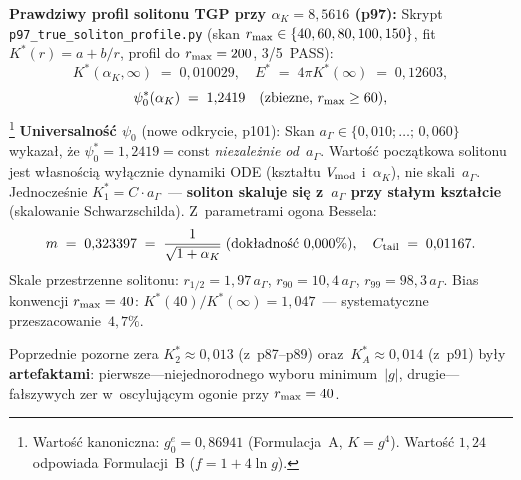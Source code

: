 \begin{remark}
\medskip
\textbf{Prawdziwy profil solitonu TGP przy $\alpha_K=8{,}5616$ (p97):}
Skrypt \texttt{p97\_true\_soliton\_profile.py}
(skan $r_{\rm max}\in\{40,60,80,100,150\}$, fit $K^*(r)=a+b/r$,
profil do $r_{\rm max}=200$, 3/5~PASS):
\begin{equation}\label{eq:Kstar-true}
  K^*(\alpha_K, \infty) \;=\; 0{,}010029,
  \quad
  E^* \;=\; 4\pi K^*(\infty) \;=\; 0{,}12603,
\end{equation}
\begin{equation}\label{eq:psi0-true}
  \psi_0^*(\alpha_K) \;=\; 1{,}2419 \quad \text{(zbiezne, } r_{\rm max}\geq 60\text{)},
\end{equation}%
\footnote{Warto\'s\'c kanoniczna: $g_0^e = 0{,}86941$ (Formulacja~A, $K = g^4$). Warto\'s\'c $1{,}24$ odpowiada Formulacji~B ($f = 1+4\ln g$).}
\textbf{Universalno\'s\'c $\psi_0$} (nowe odkrycie, p101):
Skan $a_\Gamma\in\{0{,}010;\ldots;\,0{,}060\}$ wykaza\l{}, \.ze
$\psi_0^* = 1{,}2419 = \mathrm{const}$ \emph{niezale\.znie od~$a_\Gamma$}.
Warto\'s\'c pocz\k{a}tkowa solitonu jest w\l{}asno\'sci\k{a} wy\l{}\k{a}cznie dynamiki
ODE (kszta\l{}tu $V_{\rm mod}$ i~$\alpha_K$), nie skali~$a_\Gamma$.
Jednocze\'snie $K^*_1 = C\cdot a_\Gamma$~--- \textbf{soliton skaluje si\k{e}
z~$a_\Gamma$ przy sta\l{}ym kszta\l{}cie} (skalowanie Schwarzschilda).
Z~parametrami ogona Bessela:
\begin{equation}\label{eq:tail-params-alphak}
  m \;=\; 0{,}323397 \;=\; \frac{1}{\sqrt{1+\alpha_K}} \;\text{(dok\l{}adno\'s\'c } 0{,}000\%\text{)},
  \quad
  C_{\rm tail} \;=\; 0{,}01167.
\end{equation}
Skale przestrzenne solitonu:
$r_{1/2} = 1{,}97\,a_\Gamma$,\;
$r_{90} = 10{,}4\,a_\Gamma$,\;
$r_{99} = 98{,}3\,a_\Gamma$.
Bias konwencji $r_{\rm max}=40$:
$K^*(40)/K^*(\infty) = 1{,}047$~--- systematyczne przeszacowanie~$4{,}7\%$.

Poprzednie pozorne zera $K^*_2 \approx 0{,}013$ (z~p87--p89) oraz~$K^*_A \approx 0{,}014$
(z~p91) by\l{}y \textbf{artefaktami}: pierwsze---niejednorodnego wyboru minimum~$|g|$,
drugie---fa\l{}szywych zer w~oscyluj\k{a}cym ogonie przy $r_{\rm max}=40$.


\end{remark}
